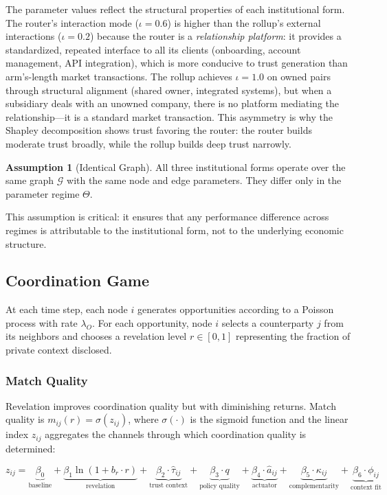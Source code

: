 \documentclass[12pt]{article}
\theoremstyle{definition}
\newtheorem{assumption}{Assumption}
\begin{document}
The parameter values reflect the structural properties of each institutional form. The router's interaction mode ($\iota = 0.6$) is higher than the rollup's external interactions ($\iota = 0.2$) because the router is a \textit{relationship platform}: it provides a standardized, repeated interface to all its clients (onboarding, account management, API integration), which is more conducive to trust generation than arm's-length market transactions. The rollup achieves $\iota = 1.0$ on owned pairs through structural alignment (shared owner, integrated systems), but when a subsidiary deals with an unowned company, there is no platform mediating the relationship---it is a standard market transaction. This asymmetry is why the Shapley decomposition shows trust favoring the router: the router builds moderate trust broadly, while the rollup builds deep trust narrowly.

\begin{assumption}[Identical Graph]
\label{ass:identical}
All three institutional forms operate over the same graph $\mathcal{G}$ with the same node and edge parameters. They differ only in the parameter regime $\Theta$.
\end{assumption}

This assumption is critical: it ensures that any performance difference across regimes is attributable to the institutional form, not to the underlying economic structure.

\subsection{Coordination Game}

At each time step, each node $i$ generates opportunities according to a Poisson process with rate $\lambda_O$. For each opportunity, node $i$ selects a counterparty $j$ from its neighbors and chooses a revelation level $r \in [0,1]$ representing the fraction of private context disclosed.

\subsubsection{Match Quality}

Revelation improves coordination quality but with diminishing returns. Match quality is $m_{ij}(r) = \sigma(z_{ij})$, where $\sigma(\cdot)$ is the sigmoid function and the linear index $z_{ij}$ aggregates the channels through which coordination quality is determined:

\begin{equation}
\label{eq:match}
z_{ij} = \underbrace{\beta_0}_{\text{baseline}} + \underbrace{\beta_1 \ln(1 + b_r \cdot r)}_{\text{revelation}} + \underbrace{\beta_2 \cdot \hat{\tau}_{ij}}_{\text{trust context}} + \underbrace{\beta_3 \cdot q}_{\text{policy quality}} + \underbrace{\beta_4 \cdot \hat{a}_{ij}}_{\text{actuator}} + \underbrace{\beta_5 \cdot \kappa_{ij}}_{\text{complementarity}} + \underbrace{\beta_6 \cdot \phi_{ij}}_{\text{context fit}}
\end{equation}
\end{document}
